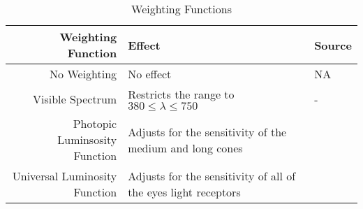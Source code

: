 

\begin{table}
\centering %
\caption{Weighting Functions}
\begin{tabular}{r l l}
  \toprule
  Weighting Function & Effect & Source \\
  \midrule
  No Weighting  
      & No effect
      & NA \\
  Visible Spectrum
      & Restricts the range to $380 \le \lambda \le 750$
      & - \\
  Photopic Luminsosity Function
      & Adjusts for the sensitivity of the medium and long cones
      & \cite{CVRL2008} \\
  Universal Luminosity Function
      & Adjusts for the sensitivity of all of the eyes light receptors
      & \cite{rea2018}\\
  \bottomrule
\end{tabular}
\label{tab:wfs}
\end{table}

